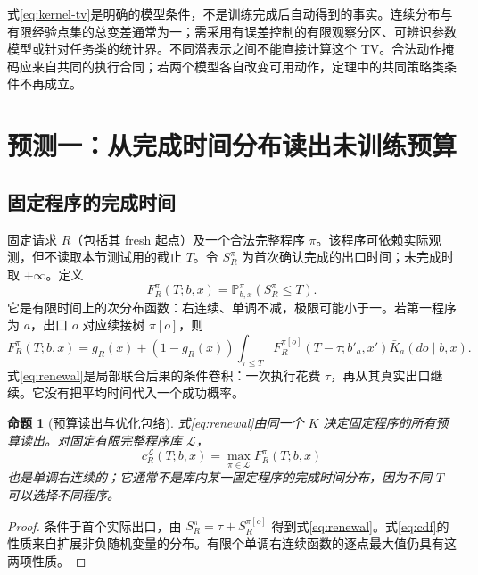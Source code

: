 \documentclass[11pt,a4paper,fontset=fandol]{ctexart}
\newtheorem{proposition}[theorem]{命题}
\theoremstyle{definition}
\theoremstyle{remark}
\numberwithin{equation}{section}
\newcommand{\Pp}{\mathbb P}
\begin{document}
\begin{scopebox}
式\eqref{eq:kernel-tv}是明确的模型条件，不是训练完成后自动得到的事实。连续分布与有限经验点集的总变差通常为一；需采用有误差控制的有限观察分区、可辨识参数模型或针对任务类的统计界。不同潜表示之间不能直接计算这个 TV。合法动作掩码应来自共同的执行合同；若两个模型各自改变可用动作，定理中的共同策略类条件不再成立。
\end{scopebox}

\section{预测一：从完成时间分布读出未训练预算}
\label{sec:budget}
\subsection{固定程序的完成时间}
固定请求 $R$（包括其 fresh 起点）及一个合法完整程序 $\pi$。该程序可依赖实际观测，但不读取本节测试用的截止 $T$。令 $S_R^\pi$ 为首次确认完成的出口时间；未完成时取 $+\infty$。定义
\begin{equation}
 F_R^\pi(T;b,x)=\Pp_{b,x}^{\pi}(S_R^\pi\le T).
 \label{eq:cdf}
\end{equation}
它是有限时间上的次分布函数：右连续、单调不减，极限可能小于一。若第一程序为 $a$，出口 $o$ 对应续接树 $\pi[o]$，则
\begin{equation}
 F_R^\pi(T;b,x)=g_R(x)+(1-g_R(x))
 \int_{\tau\le T}
 F_R^{\pi[o]}(T-\tau;b'_a,x')
 \bar K_a(do\mid b,x).
 \label{eq:renewal}
\end{equation}
式\eqref{eq:renewal}是局部联合后果的条件卷积：一次执行花费 $\tau$，再从其真实出口继续。它没有把平均时间代入一个成功概率。

\begin{proposition}[预算读出与优化包络]
\label{prop:cdf}
式\eqref{eq:renewal}由同一个 $K$ 决定固定程序的所有预算读出。对固定有限完整程序库 $\mathcal L$，
\begin{equation}
 c_R^{\mathcal L}(T;b,x)=\max_{\pi\in\mathcal L}F_R^\pi(T;b,x)
 \label{eq:envelope}
\end{equation}
也是单调右连续的；它通常不是库内某一固定程序的完成时间分布，因为不同 $T$ 可以选择不同程序。
\end{proposition}
\begin{proof}
条件于首个实际出口，由 $S_R^\pi=\tau+S_R^{\pi[o]}$ 得到式\eqref{eq:renewal}。式\eqref{eq:cdf}的性质来自扩展非负随机变量的分布。有限个单调右连续函数的逐点最大值仍具有这两项性质。
\end{proof}
\end{document}
